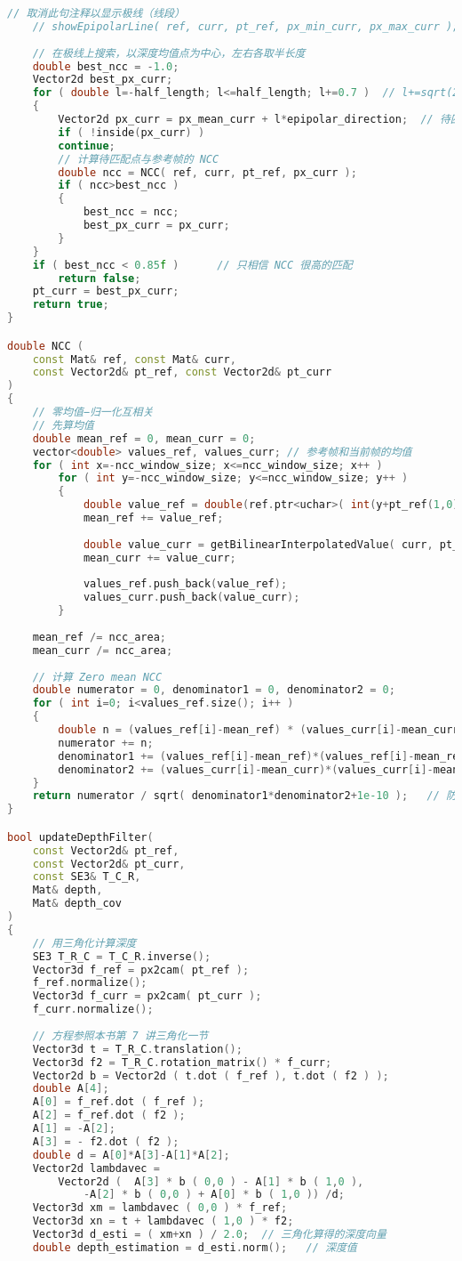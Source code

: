 \begin{lstlisting}[language=c++,caption=slambook/ch13/dense\_monocular/dense\_mapping.cpp（片段）]
	// 取消此句注释以显示极线（线段）
	// showEpipolarLine( ref, curr, pt_ref, px_min_curr, px_max_curr );
	
	// 在极线上搜索，以深度均值点为中心，左右各取半长度
	double best_ncc = -1.0;
	Vector2d best_px_curr; 
	for ( double l=-half_length; l<=half_length; l+=0.7 )  // l+=sqrt(2)/2
	{
		Vector2d px_curr = px_mean_curr + l*epipolar_direction;  // 待匹配点
		if ( !inside(px_curr) )
		continue; 
		// 计算待匹配点与参考帧的 NCC
		double ncc = NCC( ref, curr, pt_ref, px_curr );
		if ( ncc>best_ncc )
		{
			best_ncc = ncc; 
			best_px_curr = px_curr;
		}
	}
	if ( best_ncc < 0.85f )      // 只相信 NCC 很高的匹配
		return false; 
	pt_curr = best_px_curr;
	return true;
}

double NCC (
	const Mat& ref, const Mat& curr, 
	const Vector2d& pt_ref, const Vector2d& pt_curr
)
{
	// 零均值−归一化互相关
	// 先算均值
	double mean_ref = 0, mean_curr = 0;
	vector<double> values_ref, values_curr; // 参考帧和当前帧的均值
	for ( int x=-ncc_window_size; x<=ncc_window_size; x++ )
		for ( int y=-ncc_window_size; y<=ncc_window_size; y++ )
		{
			double value_ref = double(ref.ptr<uchar>( int(y+pt_ref(1,0)) )[ int(x+pt_ref(0,0)) ])/255.0;
			mean_ref += value_ref;
			
			double value_curr = getBilinearInterpolatedValue( curr, pt_curr+Vector2d(x,y) );
			mean_curr += value_curr;
			
			values_ref.push_back(value_ref);
			values_curr.push_back(value_curr);
		}
	
	mean_ref /= ncc_area;
	mean_curr /= ncc_area;
	
	// 计算 Zero mean NCC
	double numerator = 0, denominator1 = 0, denominator2 = 0;
	for ( int i=0; i<values_ref.size(); i++ )
	{
		double n = (values_ref[i]-mean_ref) * (values_curr[i]-mean_curr);
		numerator += n;
		denominator1 += (values_ref[i]-mean_ref)*(values_ref[i]-mean_ref);
		denominator2 += (values_curr[i]-mean_curr)*(values_curr[i]-mean_curr);
	}
	return numerator / sqrt( denominator1*denominator2+1e-10 );   // 防止分母出现零
}

bool updateDepthFilter(
	const Vector2d& pt_ref, 
	const Vector2d& pt_curr, 
	const SE3& T_C_R,
	Mat& depth, 
	Mat& depth_cov
)
{
	// 用三角化计算深度
	SE3 T_R_C = T_C_R.inverse();
	Vector3d f_ref = px2cam( pt_ref );
	f_ref.normalize();
	Vector3d f_curr = px2cam( pt_curr );
	f_curr.normalize();
	
	// 方程参照本书第 7 讲三角化一节
	Vector3d t = T_R_C.translation();
	Vector3d f2 = T_R_C.rotation_matrix() * f_curr; 
	Vector2d b = Vector2d ( t.dot ( f_ref ), t.dot ( f2 ) );
	double A[4];
	A[0] = f_ref.dot ( f_ref );
	A[2] = f_ref.dot ( f2 );
	A[1] = -A[2];
	A[3] = - f2.dot ( f2 );
	double d = A[0]*A[3]-A[1]*A[2];
	Vector2d lambdavec = 
		Vector2d (  A[3] * b ( 0,0 ) - A[1] * b ( 1,0 ),
			-A[2] * b ( 0,0 ) + A[0] * b ( 1,0 )) /d;
	Vector3d xm = lambdavec ( 0,0 ) * f_ref;
	Vector3d xn = t + lambdavec ( 1,0 ) * f2;
	Vector3d d_esti = ( xm+xn ) / 2.0;  // 三角化算得的深度向量
	double depth_estimation = d_esti.norm();   // 深度值
	

\end{lstlisting}
